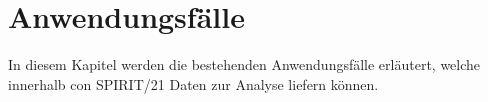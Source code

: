 \chapter{Anwendungsfälle}
In diesem Kapitel werden die bestehenden Anwendungsfälle erläutert, welche innerhalb con \mbox{SPIRIT/21} Daten zur Analyse liefern können.











